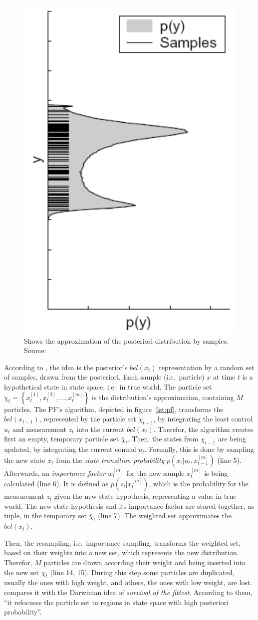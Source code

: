 \begin{figure}
	\includegraphics[height=0.45\textwidth]{figures/pf_approx}
	\caption{Shows the approximation of the posteriori distribution by samples. Source: \citep{thrun:prob_robo}}
	\label{fig:pf_approx}
\end{figure} 

According to \citet{thrun:prob_robo}, the idea is the posterior's $bel(x_t)$ representation by a random set of samples, drawn from the posteriori. Each sample (i.e.\ particle) $x$ at time $t$ is a hypothetical state in state space, i.e.\ in true world. The particle set $\chi_t = \left\{ x^{[1]}_t, x^{[2]}_t, \ldots, x^{[m]}_t \right\}$ is the distribution's approximation, containing $M$ particles. The \acs{PF}'s algorithm, depicted in figure~\ref{lst:pf}, transforms the $bel(x_{t-1})$, represented by the particle set $\chi_{t-1}$, by integrating the least control $u_t$ and measurement $z_t$ into the current $bel(x_t)$. Therefor, the algorithm creates first an empty, temporary particle set $\bar{\chi}_t$. Then, the states from $\chi_{t-1}$ are being updated, by integrating the current control $u_t$. Formally, this is done by sampling the new state $x_t$ from the \emph{state transition probability} $p(x_t|u_t, x^{[m]}_{t-1})$ (line 5). Afterwards, an \emph{importance factor} $w^{[m]}_t$ for the new sample $x^{[m]}_t$ is being calculated (line 6). It is defined as $p(z_t|x^{[m]}_t)$, which is the probability for the measurement $z_t$ given the new state hypothesis, representing a value in true world. The new state hypothesis and its importance factor are stored together, as tuple, in the temporary set $\bar{\chi}_t$ (line 7). The weighted set approximates the $bel(x_t)$.

Then, the resampling, i.e.\ importance sampling, transforms the weighted set, based on their weights into a new set, which represents the new distribution. Therefor, $M$ particles are drawn according their weight and being inserted into the new set $\chi_t$ (line 14, 15). During this step some particles are duplicated, usually the ones with high weight, and others, the ones with low weight, are lost. \citet{thrun:prob_robo} compares it with the Darwinian idea of \emph{survival of the fittest}. According to them, ``it refocuses the particle set to regions in state space with high posteriori probability''.
 
